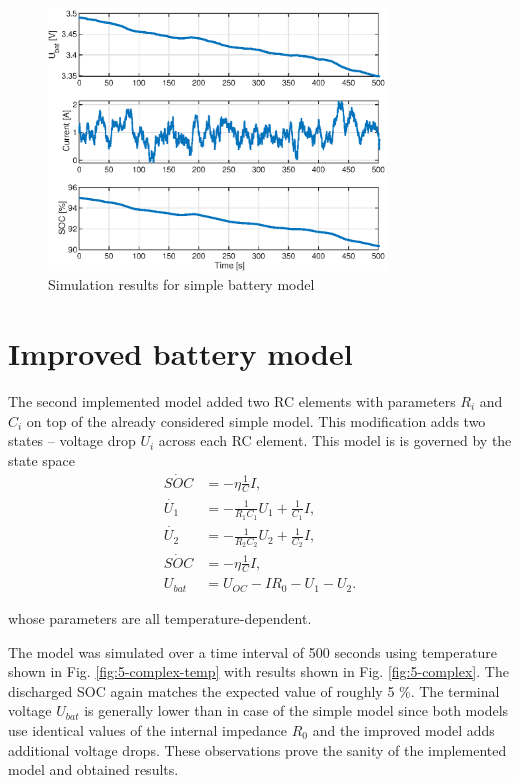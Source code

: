 \begin{figure}[hbtp]
    \centering
    \includegraphics[width=0.8\textwidth]{figures/5/simple-everything.eps}
    \caption{Simulation results for simple battery model}
    \label{fig:5-simple}
\end{figure}

\section{Improved battery model}

The second implemented model added two RC elements with parameters $R_i$ and $C_i$ on top of the already considered simple model. This modification adds two states -- voltage drop $U_i$ across each RC element. This model is is governed by the state space
\begin{equation}
\begin{split}
    \dot{SOC} &= -\eta \frac{1}{C} I, \\
    \dot{U_1} &= -\frac{1}{R_1 C_1} U_1 + \frac{1}{C_1} I, \\
    \dot{U_2} &= -\frac{1}{R_2 C_2} U_2 + \frac{1}{C_2} I, \\
    \dot{SOC} &= -\eta \frac{1}{C} I, \\
    U_{bat} &= U_{OC} - I R_0 - U_1 - U_2.
\end{split}
\label{eq:5-complex}
\end{equation}


whose parameters are all temperature-dependent.

The model was simulated over a time interval of 500 seconds using temperature shown in Fig. \ref{fig:5-complex-temp} with results shown in Fig. \ref{fig:5-complex}. The discharged SOC again matches the expected value of roughly 5 \%. The terminal voltage $U_{bat}$ is generally lower than in case of the simple model since both models use identical values of the internal impedance $R_0$ and the improved model adds additional voltage drops. These observations prove the sanity of the implemented model and obtained results.


